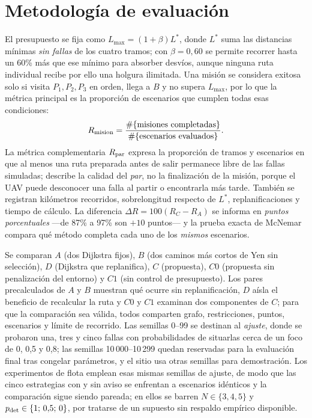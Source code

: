 \documentclass[journal,10pt]{IEEEtran}
\begin{document}
\section{Metodología de evaluación}

El presupuesto se fija como $L_{\max}=(1+\beta)L^*$, donde $L^*$ suma las
distancias mínimas \emph{sin fallas} de los cuatro tramos; con
$\beta=0{,}60$ se permite recorrer hasta un 60\% más que ese mínimo para
absorber desvíos, aunque ninguna ruta individual recibe por ello una
holgura ilimitada. Una misión se considera exitosa solo si visita
$P_1,P_2,P_3$ en orden, llega a $B$ y no supera $L_{\max}$, por lo que
la métrica principal es la proporción de escenarios que cumplen todas
esas condiciones:
\begin{equation}
 R_{\rm mision}=\frac{\#\{\text{misiones completadas}\}}
                         {\#\{\text{escenarios evaluados}\}}.
\end{equation}
La métrica complementaria $R_{\rm par}$ expresa la proporción de tramos
y escenarios en que al menos una ruta preparada antes de salir permanece
libre de las fallas simuladas; describe la calidad del \emph{par}, no la
finalización de la misión, porque el UAV puede desconocer una falla al
partir o encontrarla más tarde. También se registran kilómetros
recorridos, sobrelongitud respecto de $L^*$, replanificaciones y tiempo
de cálculo. La diferencia $\Delta R=100(R_C-R_A)$ se informa en
\emph{puntos porcentuales} ---de 87\% a 97\% son $+10$ puntos--- y la
prueba exacta de McNemar compara qué método completa cada uno de los
\emph{mismos} escenarios.

Se comparan $A$ (dos Dijkstra fijos), $B$ (dos caminos más cortos de Yen
sin selección), $D$ (Dijkstra que replanifica), $C$ (propuesta), $C0$
(propuesta sin penalización del entorno) y $C1$ (sin control de
presupuesto). Los pares precalculados de $A$ y $B$ muestran qué ocurre
sin replanificación, $D$ aísla el beneficio de recalcular la ruta y $C0$
y $C1$ examinan dos componentes de $C$; para que la comparación sea
válida, todos comparten grafo, restricciones, puntos, escenarios y límite
de recorrido. Las semillas 0--99 se destinan al \emph{ajuste}, donde se
probaron una, tres y cinco fallas con probabilidades de situarlas cerca
de un foco de 0, 0,5 y 0,8; las semillas 10\,000--10\,299 quedan
reservadas para la evaluación final tras congelar parámetros, y el sitio
usa otras semillas para demostración. Los experimentos de flota emplean esas
mismas semillas de ajuste, de modo que las cinco estrategias con y sin aviso
se enfrentan a escenarios idénticos y la comparación sigue siendo pareada; en
ellos se barren $N\in\{3,4,5\}$ y
$p_{\rm det}\in\{1;\,0{,}5;\,0\}$, por tratarse de un supuesto sin respaldo
empírico disponible.
\end{document}
